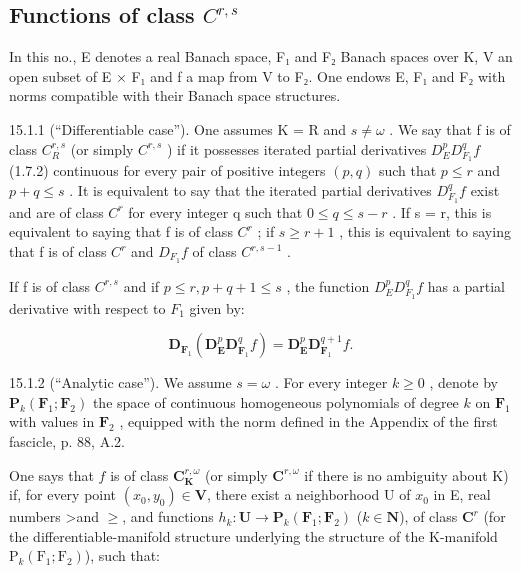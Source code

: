 \subsection{\texorpdfstring{Functions of class \(C^{r,s}\)}{Functions of class C\^{}\{r,s\}}}

In this no., E denotes a real Banach space, F₁ and F₂ Banach spaces over K, V an open subset of E × F₁ and f a map from V to F₂. One endows E, F₁ and F₂ with norms compatible with their Banach space structures.

15.1.1 (“Differentiable case”). One assumes K = R and \(s \neq \omega\) . We say that f is of class \(C_{R}^{r,s}\) (or simply \(C^{r,s}\) ) if it possesses iterated partial derivatives \(D_{E}^{p}D_{F_{1}}^{q}f\) (1.7.2) continuous for every pair of positive integers \((p,q)\) such that \(p \leqslant r\) and \(p + q \leqslant s\) . It is equivalent to say that the iterated partial derivatives \(D_{F_{1}}^{q}f\) exist and are of class \(C^{r}\) for every integer q such that \(0 \leqslant q \leqslant s - r\) . If s = r, this is equivalent to saying that f is of class \(C^{r}\) ; if \(s \geqslant r + 1\) , this is equivalent to saying that f is of class \(C^{r}\) and \(D_{F_{1}}f\) of class \(C^{r,s-1}\) .

If f is of class \(C^{r,s}\) and if \(p \leqslant r, p + q + 1 \leqslant s\) , the function \(D_{E}^{p}D_{F_{1}}^{q}f\) has a partial derivative with respect to \(F_{1}\) given by:

\[
\mathbf {D} _ {\mathbf {F} _ {1}} (\mathbf {D} _ {\mathbf {E}} ^ {p} \mathbf {D} _ {\mathbf {F} _ {1}} ^ {q} f) = \mathbf {D} _ {\mathbf {E}} ^ {p} \mathbf {D} _ {\mathbf {F} _ {1}} ^ {q + 1} f.\tag{1}
\]

15.1.2 (“Analytic case”). We assume \(s = \omega\) . For every integer \(k \geqslant 0\) , denote by \(\mathbf{P}_{k}(\mathbf{F}_{1}; \mathbf{F}_{2})\) the space of continuous homogeneous polynomials of degree \(k\) on \(\mathbf{F}_{1}\) with values in \(\mathbf{F}_{2}\) , equipped with the norm defined in the Appendix of the first fascicle, p. 88, A.2.

One says that \(f\) is of class \(\mathbf{C}_{\mathbf{K}}^{r,\omega}\) (or simply \(\mathbf{C}^{r,\omega}\) if there is no ambiguity about K) if, for every point \((x_{0},y_{0})\in\mathbf{V}\), there exist a neighborhood U of \(x_{0}\) in E, real numbers \textgreater and \(\geqslant\), and functions \(h_{k}\colon\mathbf{U}\to\mathbf{P}_{k}(\mathbf{F}_{1};\mathbf{F}_{2})\) (\(k\in\mathbf{N}\)), of class \(\mathbf{C}^{r}\) (for the differentiable-manifold structure underlying the structure of the K-manifold \(\mathrm{P}_{k}(\mathrm{F}_{1};\mathrm{F}_{2})\)), such that:

